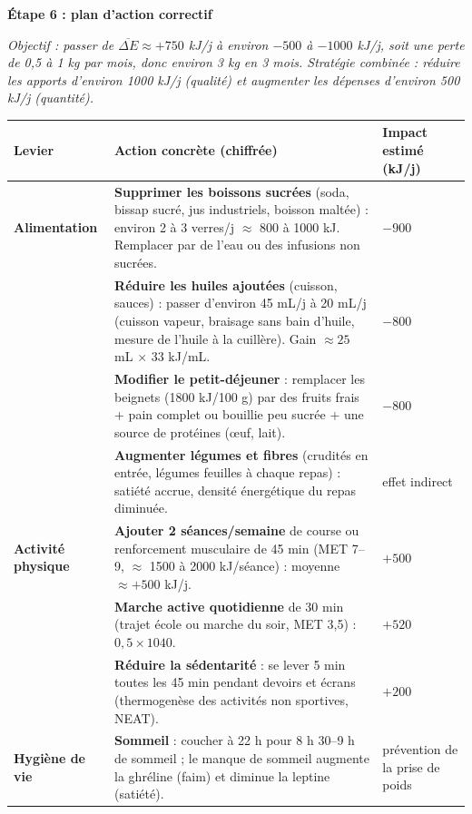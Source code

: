 \documentclass[11pt]{article}
\begin{document}
\begin{exoresolu}
\textbf{Étape 6 : plan d'action correctif}
\par
\textit{Objectif : passer de $\overline{\Delta E} \approx +750$ kJ/j à environ $-500$ à $-1000$ kJ/j, soit une perte de 0,5 à 1 kg par mois, donc environ 3 kg en 3 mois. Stratégie combinée : réduire les apports d'environ 1000 kJ/j (qualité) et augmenter les dépenses d'environ 500 kJ/j (quantité).}

\begin{center}
\begin{tabularx}{\linewidth}{|l|X|X|}\hline
\rowcolor{poppurpleL}
\textbf{Levier} & \textbf{Action concrète (chiffrée)} & \textbf{Impact estimé (kJ/j)} \\ \hline
\textbf{Alimentation} & \textbf{Supprimer les boissons sucrées} (soda, bissap sucré, jus industriels, boisson maltée) : environ 2 à 3 verres/j $\approx$ 800 à 1000 kJ. Remplacer par de l'eau ou des infusions non sucrées. & $-900$ \\ \hline
& \textbf{Réduire les huiles ajoutées} (cuisson, sauces) : passer d'environ 45 mL/j à 20 mL/j (cuisson vapeur, braisage sans bain d'huile, mesure de l'huile à la cuillère). Gain $\approx 25$ mL $\times$ 33 kJ/mL. & $-800$ \\ \hline
& \textbf{Modifier le petit-déjeuner} : remplacer les beignets (1800 kJ/100 g) par des fruits frais + pain complet ou bouillie peu sucrée + une source de protéines (œuf, lait). & $-800$ \\ \hline
& \textbf{Augmenter légumes et fibres} (crudités en entrée, légumes feuilles à chaque repas) : satiété accrue, densité énergétique du repas diminuée. & effet indirect \\ \hline
\textbf{Activité physique} & \textbf{Ajouter 2 séances/semaine} de course ou renforcement musculaire de 45 min (MET 7--9, $\approx$ 1500 à 2000 kJ/séance) : moyenne $\approx +500$ kJ/j. & $+500$ \\ \hline
& \textbf{Marche active quotidienne} de 30 min (trajet école ou marche du soir, MET 3,5) : $0,5 \times 1040$. & $+520$ \\ \hline
& \textbf{Réduire la sédentarité} : se lever 5 min toutes les 45 min pendant devoirs et écrans (thermogenèse des activités non sportives, NEAT). & $+200$ \\ \hline
\textbf{Hygiène de vie} & \textbf{Sommeil} : coucher à 22 h pour 8 h 30--9 h de sommeil ; le manque de sommeil augmente la ghréline (faim) et diminue la leptine (satiété). & prévention de la prise de poids \\ \hline

\end{tabularx}
\end{center}
\end{exoresolu}
\end{document}
